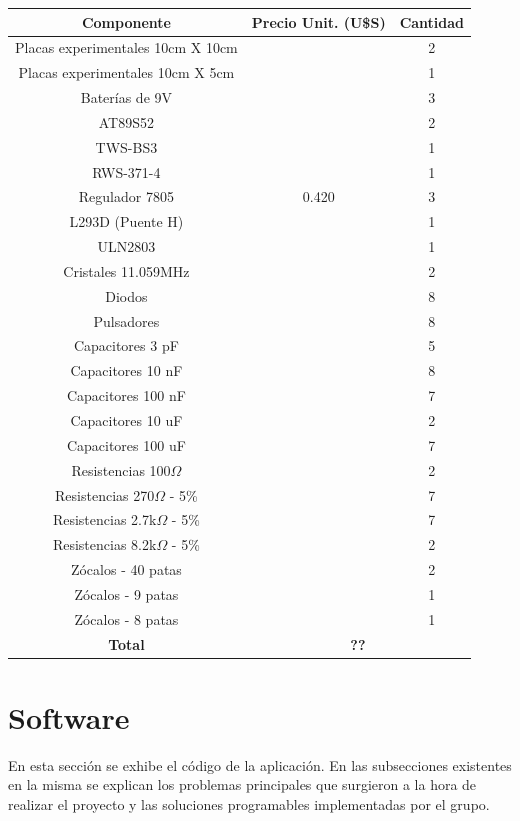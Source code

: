 \documentclass[a4paper,10pt]{article}
\begin{document}
		\begin{tabular}{|c|c|c|}
			\hline
			\textbf{Componente} & \textbf{Precio Unit. (U\$S}) & \textbf{Cantidad} \\
			\hline
			Placas experimentales 10cm X 10cm & & 2\\
			\hline
			Placas experimentales 10cm X 5cm & & 1\\
			\hline
			Baterías de 9V & & 3\\
			\hline
			AT89S52 & & 2\\
			\hline
			TWS-BS3 & & 1\\
			\hline
			RWS-371-4 & & 1\\
			\hline
			Regulador 7805 & 0.420 & 3\\
			\hline
			L293D (Puente H) & & 1\\
			\hline
			ULN2803 & & 1\\
			\hline
			Cristales 11.059MHz & & 2\\
			\hline
			Diodos & & 8\\
			\hline
			Pulsadores & & 8\\
			\hline
			Capacitores 3 pF & & 5\\
			\hline
			Capacitores 10 nF & & 8\\
			\hline
			Capacitores 100 nF & & 7\\
			\hline
			Capacitores 10 uF & & 2\\
			\hline
			Capacitores 100 uF &  & 7\\
			\hline
			Resistencias 100$\Omega$ & & 2\\
			\hline
			Resistencias 270$\Omega$ - 5\% & & 7\\
			\hline
			Resistencias 2.7k$\Omega$ - 5\% & & 7\\
			\hline
			Resistencias 8.2k$\Omega$ - 5\% & & 2\\
			\hline
			Zócalos - 40 patas & & 2\\
			\hline
			Zócalos - 9 patas & & 1\\
			\hline
			Zócalos - 8 patas & & 1\\
			\hline
			\hline
			\textbf{Total} & \multicolumn{2}{|c|}{\textbf{??}} \\
			\hline   
		\end{tabular}
	\section{Software}
		En esta sección se exhibe el código de la aplicación. En las subsecciones existentes en la misma se explican los problemas principales que surgieron
		a la hora de realizar el proyecto y las soluciones programables implementadas por el grupo.  
\end{document}
